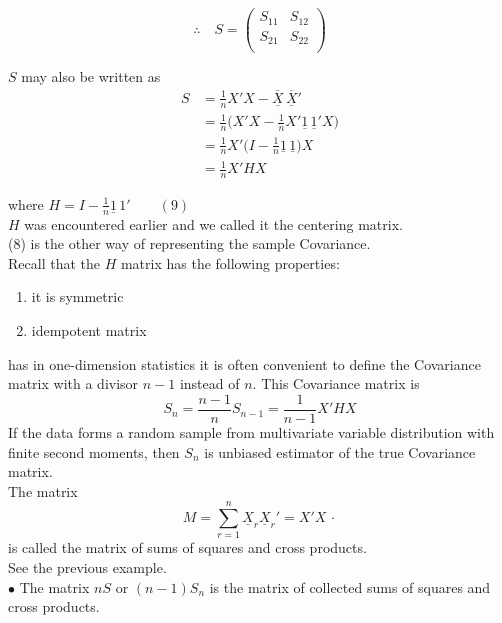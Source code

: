 \documentclass[11pt,a4paper]{article}
\theoremstyle{definition}
\begin{document}
$$\therefore \quad  S=
\begin{pmatrix}
S_{11} & S_{12}\\
S_{21} & S_{22}\\
\end{pmatrix}
$$

$S$ may also be written as 
\begin{align*}
S & = \frac{1}{n}X'X-\overline{\underline{X}}\,\overline{\underline{X}}'\\
  & = \frac{1}{n}\bigg(X'X-\frac{1}{n}X'\underline{1}\,\underline{1}'X\bigg)\\
  & = \frac{1}{n}X'\bigg(I-\frac{1}{n}\underline{1}\,\underline{1}\bigg)X\\
  & = \frac{1}{n}X'HX\tag{8}
\end{align*}


where $\displaystyle{H=I-\frac{1}{n}\underline{1}\,1'}\qquad (9)$\\
$H$ was encountered earlier and we called it the centering matrix.\\
(8) is the other way of representing the sample Covariance.\\
Recall that the $H$ matrix has the following properties:
\begin{enumerate}
\item it is symmetric
\item idempotent matrix
\end{enumerate}

has in one-dimension statistics it is often convenient to define the Covariance matrix with a divisor $n-1$ instead of $n$. This Covariance matrix is 
\begin{equation}\tag{10}
S_n= \frac{n-1}{n}S_{n-1}=\frac{1}{n-1}X'HX
\end{equation}
If the data forms a random sample from multivariate variable distribution with finite second moments, then $S_n$ is unbiased estimator of the true Covariance matrix.\\

The matrix \begin{equation}\tag{11}
M= \sum^n_{r=1} \underline{X}_r\underline{X}_r'=X'X\, \cdot
\end{equation} is called the matrix of sums of squares and cross products.\\
See the previous example.\\

$\bullet$ The matrix $nS$ or $(n-1)S_n$ is the matrix of collected sums of  squares and cross products.\\\\
\end{document}

